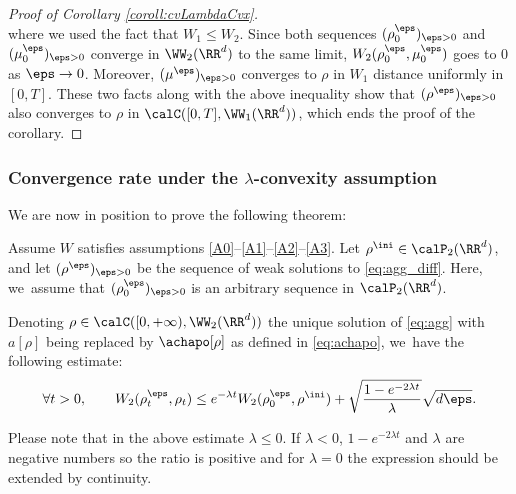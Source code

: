 \begin{proof}[Proof of Corollary \ref{coroll:cvLambdaCvx}]
\[\]
where we used the fact that $W_1 \leq W_2$. Since both sequences $(\rho_0^\eps)_{\eps>0}$ and $(\mu_0^\eps)_{\eps>0}$ converge in $\WW_2(\RR^d)$ to the same limit, $W_2(\rho_0^\eps, \mu_0^\eps)$ goes to 0 as $\eps \to 0$. Moreover, $(\mu^\eps)_{\eps>0}$ converges to $\rho$ in $W_1$ distance uniformly in $[0,T]$. These two facts along with the above inequality show that $(\rho^\eps)_{\eps>0}$ also converges to $\rho$ in $\calC([0,T], \WW_1(\RR^d))$, which ends the proof of the corollary.
\end{proof}

\subsubsection{Convergence rate under the $\lambda$-convexity assumption}

We are now in position to prove the following theorem:
\begin{theorem}\label{thm:cvOrder1/2}
Assume $W$ satisfies assumptions \eqref{A0}--\eqref{A1}--\eqref{A2}--\eqref{A3}. Let $\rho^{\ini} \in \calP_2(\RR^d)$, and let $(\rho^\eps)_{\eps > 0}$ be the sequence of weak solutions to \eqref{eq:agg_diff}. Here, we~assume that $(\rho_0^\eps)_{\eps >0}$ is an arbitrary sequence in $\calP_2(\RR^d)$.

Denoting $\rho \in \calC([0,+\infty), \WW _2(\RR^d))$ the unique solution of \eqref{eq:agg} with $a[\rho]$ being replaced by $\achapo[\rho]$ as defined in \eqref{eq:achapo}, we~have the following estimate:
\begin{equation}\label{ineq:cvgRateLambdaCvx}
\forall t>0, \qquad
W_2(\rho_t^\eps, \rho_t) \leq e^{-\lambda t} W_2(\rho_0^\eps, \rho^{\ini}) + \sqrt{\frac{1 - e^{-2\lambda t}}{\lambda}} \sqrt{d\eps}.
\end{equation}
\end{theorem}
Please note that in the above estimate $\lambda \leq 0$. If $\lambda < 0$, $1 - e^{-2\lambda t}$ and $\lambda$ are negative numbers so the ratio is positive and for $\lambda=0$ the expression should be extended by continuity.
